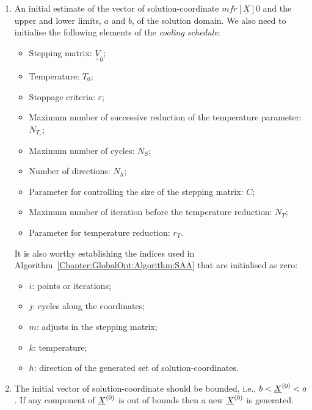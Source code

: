 \begin{enumerate}[{\bf Step 1: }]
   \item An initial estimate of the vector of solution-coordinate $mfr[\underline{X}]{}{0}$ and the upper and lower limits, $a$ and $b$, of the solution domain.  We also need to initialise the following elements of the {\it cooling schedule}:
   \begin{itemize}
      \item Stepping matrix: $\underline{\underline{V}}_{0}$;
      \item Temperature: $T_{0}$;
      \item Stoppage criteria: $\varepsilon$;
      \item Maximum number of successive reduction of the temperature parameter: $N_{T_{e}}$;
      \item Maximum number of cycles: $N_{S}$;
      \item Number of directions: $N_{h}$;
      \item Parameter for controlling the size of the stepping matrix: $C$;
      \item Maximum number of iteration before the temperature reduction: $N_{T}$;
      \item Parameter for temperature reduction: $r_{T}$.
   \end{itemize}
   It is also worthy establishing the indices used in Algorithm~\ref{Chapter:GlobalOpt:Algorithm:SAA} that are initialised as zero:
   \begin{itemize}
      \item $i$: points or iterations;
      \item $j$: cycles along the coordinates;
      \item $m$: adjusts in the stepping matrix;
      \item $k$: temperature;
      \item $h$: direction of the generated set of solution-coordinates.
   \end{itemize}

   \item The initial vector of solution-coordinate should be bounded, i.e., $b <\mfr[\underline{X}]{}{0}< a$. If any component of $\mfr[\underline{X}]{}{0}$ is out of bounds then a new $\mfr[\underline{X}]{}{0}$ is generated.


\end{enumerate}
